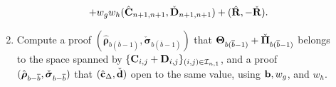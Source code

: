 \begin{description}
\begin{enumerate}
\begin{eqnarray}
       & &
     +
    w_gw_h ({\hat{\mathbf{{C}}}}_{n+1,n+1}, \check{\mathbf{{D}}}_{n+1,n+1}) +  ({\hat{\mathbf{{R}}}},-\check{\mathbf{{R}}}).
 \end{eqnarray}

\item Compute a proof $(\hat{\boldsymbol \rho}_{b(\overline{b}-1)},\check{\boldsymbol \sigma}_{b(\overline{b}-1)})$
that $\mathbf{{\Theta}}_{b(\overline{b}-1)}+\check{\mathbf{{\Pi}}}_{b(\overline{b}-1)}$
belongs to the space spanned by $\{\mathbf{{C}}_{i,j}+\mathbf{{D}}_{i,j}\}_{(i,j)\in\mathcal{I}_{n,1}}$,
 and a proof 
$(\hat{{\boldsymbol \rho}}_{b-\overline{b}}, \check{{\boldsymbol \sigma}}_{b-\overline{b}})$
that
$({\hat{\mathbf{c}}}_\Delta,\check{\mathbf{d}})$ open to the same value,
using $\mathbf{b},w_g$, and $w_h$. 
\end{enumerate}


\end{description}
